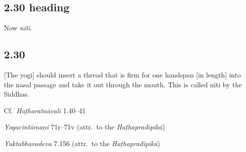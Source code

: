 \begin{ekdosis}
\subsection*{2.30 heading}
\begin{translation}[hp02_030a]
Now \emph{nīti}.
\end{translation}


\subsection*{2.30}
\begin{translation}[hp02_030]
{[}The yogi] should insert a thread that is firm for one handspan [in length] into the nasal passage and take it out through the mouth. This is called nīti by the Siddhas.
\end{translation}


\begin{testimonia}[hp02_030]
Cf.~\emph{Haṭharatnāvalī} 1.40–41

\begin{versinnote}
\end{versinnote}

\emph{Yogacintāmaṇi} 71r–71v (attr.~to the \emph{Haṭhapradīpikā})

\begin{versinnote}
\end{versinnote}

\emph{Yuktabhavadeva} 7.156 (attr.~to the \emph{Haṭhapradīpikā})


\end{testimonia}
\end{ekdosis}
